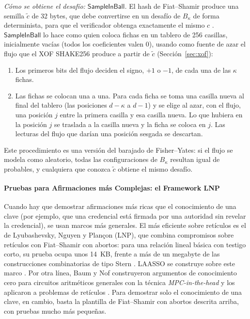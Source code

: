\textit{Cómo se obtiene el desafío: $\mathsf{SampleInBall}$.} El hash de Fiat--Shamir produce una semilla $\tilde{c}$ de 32 bytes, que debe convertirse en un desafío de $B_\kappa$ de forma determinista, para que el verificador obtenga exactamente el mismo $c$ \cite{bai2021dilithium, nist2024fips204}. $\mathsf{SampleInBall}$ lo hace como quien coloca fichas en un tablero de 256 casillas, inicialmente vacías (todos los coeficientes valen $0$), usando como fuente de azar el flujo que el XOF SHAKE256 produce a partir de $\tilde{c}$ (Sección~\ref{sec:xof}):
\begin{enumerate}
    \item Los primeros bits del flujo deciden el signo, $+1$ o $-1$, de cada una de las $\kappa$ fichas.
    \item Las fichas se colocan una a una. Para cada ficha se toma una casilla nueva al final del tablero (las posiciones $d-\kappa$ a $d-1$) y se elige al azar, con el flujo, una posición $j$ entre la primera casilla y esa casilla nueva. Lo que hubiera en la posición $j$ se traslada a la casilla nueva y la ficha se coloca en $j$. Las lecturas del flujo que darían una posición sesgada se descartan.
\end{enumerate}
Este procedimiento es una versión del barajado de Fisher--Yates: si el flujo se modela como aleatorio, todas las configuraciones de $B_\kappa$ resultan igual de probables, y cualquiera que conozca $\tilde{c}$ obtiene el mismo desafío.

\paragraph{Pruebas para Afirmaciones más Complejas: el Framework LNP}
Cuando hay que demostrar afirmaciones más ricas que el conocimiento de una clave (por ejemplo, que una credencial está firmada por una autoridad sin revelar la credencial), se usan marcos más generales. El más eficiente sobre retículos es el de Lyubashevsky, Nguyen y Plançon (LNP), que combina compromisos sobre retículos con Fiat--Shamir con abortos: para una relación lineal básica con testigo corto, su prueba ocupa unos 14~KB, frente a más de un megabyte de las construcciones combinatorias de tipo Stern \cite{lyubashevsky2022lattice}. LAASSO se construye sobre este marco \cite{ma2026laasso}. Por otra línea, Baum y Nof construyeron argumentos de conocimiento cero para circuitos aritméticos generales con la técnica \textit{MPC-in-the-head} y los aplicaron a problemas de retículos \cite{baum2020concretely}. Para demostrar solo el conocimiento de una clave, en cambio, basta la plantilla de Fiat--Shamir con abortos descrita arriba, con pruebas mucho más pequeñas.

